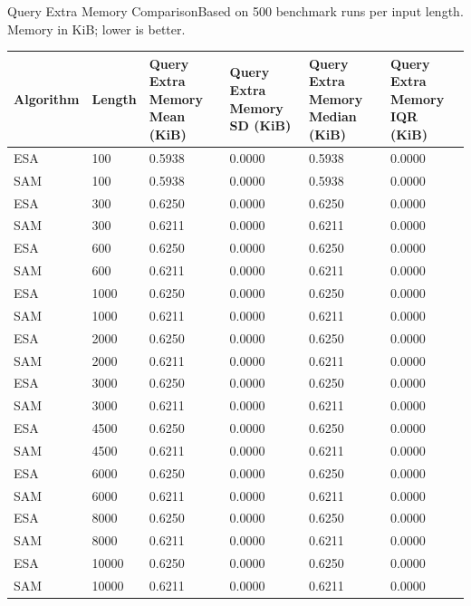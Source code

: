 \begin{benchmarktable}{Query Extra Memory Comparison}{Based on 500 benchmark runs per input length. Memory in KiB; lower is better.}
\begin{tabularx}{\textwidth}{|X|X|X|X|X|X|}
\toprule
Algorithm & Length & Query Extra Memory Mean (KiB) & Query Extra Memory SD (KiB) & Query Extra Memory Median (KiB) & Query Extra Memory IQR (KiB) \\
\midrule
ESA & 100 & 0.5938 & 0.0000 & 0.5938 & 0.0000 \\
SAM & 100 & 0.5938 & 0.0000 & 0.5938 & 0.0000 \\
\hline
ESA & 300 & 0.6250 & 0.0000 & 0.6250 & 0.0000 \\
SAM & 300 & 0.6211 & 0.0000 & 0.6211 & 0.0000 \\
\hline
ESA & 600 & 0.6250 & 0.0000 & 0.6250 & 0.0000 \\
SAM & 600 & 0.6211 & 0.0000 & 0.6211 & 0.0000 \\
\hline
ESA & 1000 & 0.6250 & 0.0000 & 0.6250 & 0.0000 \\
SAM & 1000 & 0.6211 & 0.0000 & 0.6211 & 0.0000 \\
\hline
ESA & 2000 & 0.6250 & 0.0000 & 0.6250 & 0.0000 \\
SAM & 2000 & 0.6211 & 0.0000 & 0.6211 & 0.0000 \\
\hline
ESA & 3000 & 0.6250 & 0.0000 & 0.6250 & 0.0000 \\
SAM & 3000 & 0.6211 & 0.0000 & 0.6211 & 0.0000 \\
\hline
ESA & 4500 & 0.6250 & 0.0000 & 0.6250 & 0.0000 \\
SAM & 4500 & 0.6211 & 0.0000 & 0.6211 & 0.0000 \\
\hline
ESA & 6000 & 0.6250 & 0.0000 & 0.6250 & 0.0000 \\
SAM & 6000 & 0.6211 & 0.0000 & 0.6211 & 0.0000 \\
\hline
ESA & 8000 & 0.6250 & 0.0000 & 0.6250 & 0.0000 \\
SAM & 8000 & 0.6211 & 0.0000 & 0.6211 & 0.0000 \\
\hline
ESA & 10000 & 0.6250 & 0.0000 & 0.6250 & 0.0000 \\
SAM & 10000 & 0.6211 & 0.0000 & 0.6211 & 0.0000 \\
\bottomrule
\end{tabularx}
\end{benchmarktable}

